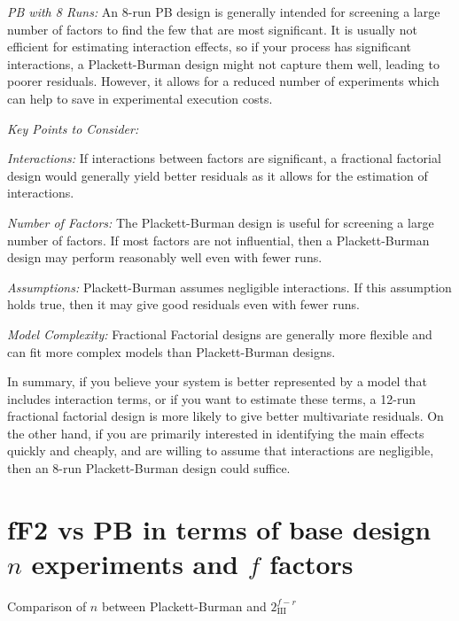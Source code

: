 \documentclass[
  12pt,
  a4paper,
]{article}
\numberwithin{equation}{section}
\theoremstyle{plain}
\theoremstyle{definition}
\theoremstyle{remark}
\theoremstyle{note}
\begin{document}
\emph{PB with 8 Runs:} An 8-run PB design is generally intended for
screening a large number of factors to find the few that are most
significant. It is usually not efficient for estimating interaction
effects, so if your process has significant interactions, a
Plackett-Burman design might not capture them well, leading to poorer
residuals. However, it allows for a reduced number of experiments which
can help to save in experimental execution costs.

\emph{Key Points to Consider:}

\emph{Interactions:} If interactions between factors are significant, a
fractional factorial design would generally yield better residuals as it
allows for the estimation of interactions.

\emph{Number of Factors:} The Plackett-Burman design is useful for
screening a large number of factors. If most factors are not
influential, then a Plackett-Burman design may perform reasonably well
even with fewer runs.

\emph{Assumptions:} Plackett-Burman assumes negligible interactions. If
this assumption holds true, then it may give good residuals even with
fewer runs.

\emph{Model Complexity:} Fractional Factorial designs are generally more
flexible and can fit more complex models than Plackett-Burman designs.

In summary, if you believe your system is better represented by a model
that includes interaction terms, or if you want to estimate these terms,
a 12-run fractional factorial design is more likely to give better
multivariate residuals. On the other hand, if you are primarily
interested in identifying the main effects quickly and cheaply, and are
willing to assume that interactions are negligible, then an 8-run
Plackett-Burman design could suffice.

\newpage

\hypertarget{ff2-vs-pb-in-terms-of-base-design-n-experiments-and-f-factors}{%
\section{\texorpdfstring{fF2 vs PB in terms of base design \(n\)
experiments and \(f\)
factors}{fF2 vs PB in terms of base design n experiments and f factors}}\label{ff2-vs-pb-in-terms-of-base-design-n-experiments-and-f-factors}}

Comparison of \(n\) between Plackett-Burman and
\(2_{\mathrm{III}}^{f-r}\)
\end{document}
